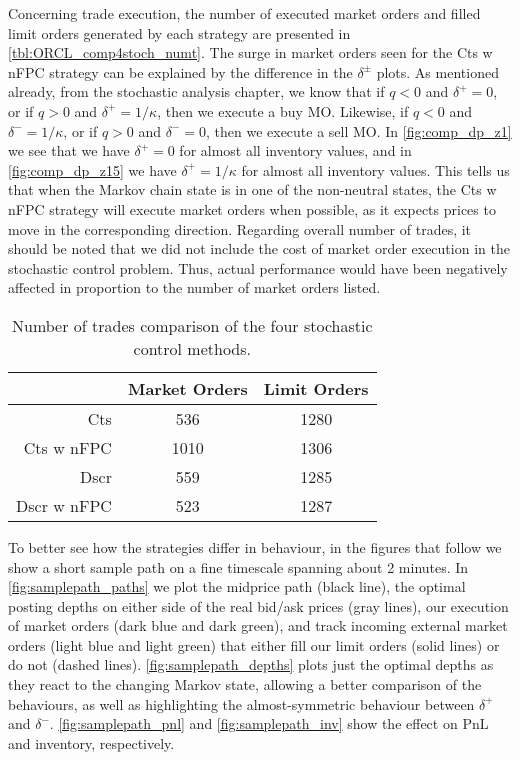 Concerning trade execution, the number of executed market orders and filled limit orders generated by each strategy are presented in \autoref{tbl:ORCL_comp4stoch_numt}. The surge in market orders seen for the Cts w nFPC strategy can be explained by the difference in the $\delta^\pm$ plots. As mentioned already, from the stochastic analysis chapter, we know that if $q < 0 $ and $\delta^+ =0$, or if $q > 0$ and $\delta^+ = 1/\kappa$, then we execute a buy MO. Likewise, if $q < 0 $ and $\delta^- =1/\kappa$, or if $q > 0$ and $\delta^- = 0$, then we execute a sell MO. In \autoref{fig:comp_dp_z1} we see that we have $\delta^+ = 0$ for almost all inventory values, and in \autoref{fig:comp_dp_z15} we have  $\delta^+ = 1/\kappa$ for almost all inventory values. This tells us that when the Markov chain state is in one of the non-neutral states, the Cts w nFPC strategy will execute market orders when possible, as it expects prices to move in the corresponding direction. Regarding overall number of trades, it should be noted that we did not include the cost of market order execution in the stochastic control problem. Thus, actual performance would have been negatively affected in proportion to the number of market orders listed.
\begin{table}
\centering
{}
\begin{tabular}{@{} r *{2}{c} @{}}
\toprule
& Market Orders & Limit Orders \\
\midrule
Cts          &  536 & 1280 \\
Cts w nFPC   & 1010 & 1306 \\
Dscr         &  559 & 1285 \\
Dscr w nFPC  &  523 & 1287 \\
\bottomrule
\end{tabular}
\caption{Number of trades comparison of the four stochastic control methods.}
\label{tbl:ORCL_comp4stoch_numt}
\end{table}

To better see how the strategies differ in behaviour, in the figures that follow we show a short sample path on a fine timescale spanning about 2 minutes. In \autoref{fig:samplepath_paths} we plot the midprice path (black line), the optimal posting depths on either side of the real bid/ask prices (gray lines), our execution of market orders (dark blue and dark green), and track incoming external market orders (light blue and light green) that either fill our limit orders (solid lines) or do not (dashed lines). \autoref{fig:samplepath_depths} plots just the optimal depths as they react to the changing Markov state, allowing a better comparison of the behaviours, as well as highlighting the almost-symmetric behaviour between $\delta^+$ and $\delta^-$. \autoref{fig:samplepath_pnl} and \autoref{fig:samplepath_inv} show the effect on PnL and inventory, respectively. 

